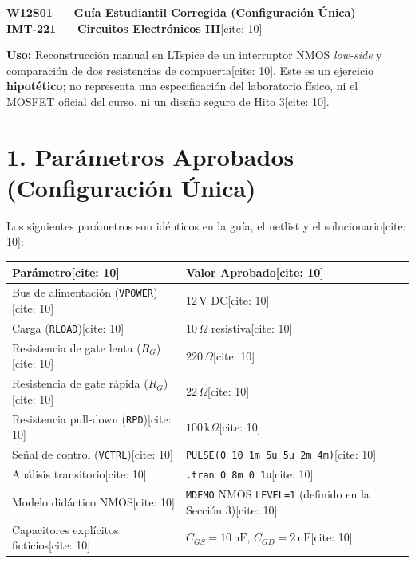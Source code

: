 \documentclass[11pt, a4paper]{article}
\begin{document}
\begin{center}
    {\Large \textbf{W12S01 — Guía Estudiantil Corregida (Configuración Única)}}\\[0.15cm]
    {\large \textbf{IMT-221 — Circuitos Electrónicos III}}[cite: 10]
\end{center}

\begin{tcolorbox}[colback=ucbblue!5, colframe=ucbblue, title=\textbf{Alcance y Propósito de la Actividad}]
    \textbf{Uso:} Reconstrucción manual en LTspice de un interruptor NMOS \textit{low-side} y comparación de dos resistencias de compuerta[cite: 10]. Este es un ejercicio \textbf{hipotético}; no representa una especificación del laboratorio físico, ni el MOSFET oficial del curso, ni un diseño seguro de Hito 3[cite: 10].
\end{tcolorbox}

\section*{1. Parámetros Aprobados (Configuración Única)}
Los siguientes parámetros son idénticos en la guía, el netlist y el solucionario[cite: 10]:

\vspace{0.2cm}
\noindent
\begin{tabularx}{\textwidth}{@{} l >{\raggedright\arraybackslash}X @{}}
\toprule
\textbf{Parámetro}[cite: 10] & \textbf{Valor Aprobado}[cite: 10] \\ \midrule
Bus de alimentación (\texttt{VPOWER})[cite: 10] & $12\,\text{V DC}$[cite: 10] \\
Carga (\texttt{RLOAD})[cite: 10] & $10\,\Omega$ resistiva[cite: 10] \\
Resistencia de gate lenta ($R_G$)[cite: 10] & $220\,\Omega$[cite: 10] \\
Resistencia de gate rápida ($R_G$)[cite: 10] & $22\,\Omega$[cite: 10] \\
Resistencia pull-down (\texttt{RPD})[cite: 10] & $100\,\text{k}\Omega$[cite: 10] \\
Señal de control (\texttt{VCTRL})[cite: 10] & \texttt{PULSE(0 10 1m 5u 5u 2m 4m)}[cite: 10] \\
Análisis transitorio[cite: 10] & \texttt{.tran 0 8m 0 1u}[cite: 10] \\
Modelo didáctico NMOS[cite: 10] & \texttt{MDEMO} NMOS \texttt{LEVEL=1} (definido en la Sección 3)[cite: 10] \\
Capacitores explícitos ficticios[cite: 10] & $C_{GS} = 10\,\text{nF}$, $C_{GD} = 2\,\text{nF}$[cite: 10] \\ \bottomrule
\end{tabularx}
\end{document}
